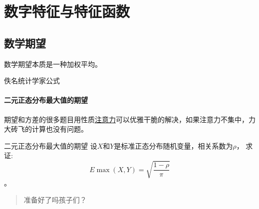 \chapter{数字特征与特征函数}
\section{数学期望}
数学期望本质是一种加权平均。

\begin{theorem}{佚名统计学家公式}

\end{theorem}
\subsubsection{二元正态分布最大值的期望}
期望和方差的很多题目用性质\underline{注意力}可以优雅干脆的解决，如果注意力不集中，力大砖飞的计算也没有问题。

\begin{problem}{二元正态分布最大值的期望}
    设\(X\)和\(Y\)是标准正态分布随机变量，相关系数为\(\rho\)，
    求证:\[E\max(X,Y)= \sqrt{\frac{1-\rho}{\pi}}\]。
\end{problem}

\begin{quote}
    准备好了吗孩子们？
\end{quote}

